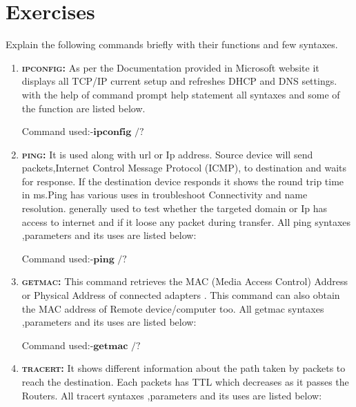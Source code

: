 \documentclass[a4paper,12pt]{article}
\newcommand{\SYN}[1]{\quad Command used:-$\textbf{#1}$}
\begin{document}
\pagebreak
\section{Exercises}

\begin{Q}
    {Explain the following commands briefly with their functions and few syntaxes.}
\end{Q}
\begin{enumerate}

    \item \textsc {\bfseries{ipconfig:}}
          As per the Documentation provided in Microsoft website it displays all TCP/IP current setup and refreshes
          DHCP and DNS settings. with the help of command prompt help statement all syntaxes and some of the function
          are listed below.

          \SYN{ipconfig /?}

          \pagebreak
    \item \textsc {\bfseries{ping:}}
          It is used along with url or Ip address. Source device will send packets,Internet Control Message Protocol (ICMP),
          to destination and waits for response.
          If the destination device responds it shows the round trip time in ms.Ping has various uses in troubleshoot Connectivity and name resolution.
          generally used to test whether the targeted domain or Ip has access to internet and if it loose any packet during transfer.
          All ping syntaxes ,parameters and its uses are listed below:

          \SYN{ping /?}



    \item \textsc {\bfseries{getmac:}}
          This command retrieves the MAC (Media Access Control) Address or Physical Address  of connected adapters .
          This command can also obtain the MAC address of Remote device/computer too.
          All getmac syntaxes ,parameters and its uses are listed below:

          \SYN{getmac /?}


    \item \textsc {\bfseries{tracert:}}
          It shows  different information about the path taken by packets to reach the destination.
          Each packets has TTL which decreases as it passes the Routers.
          All tracert syntaxes ,parameters and its uses are listed below:


\end{enumerate}
\end{document}
